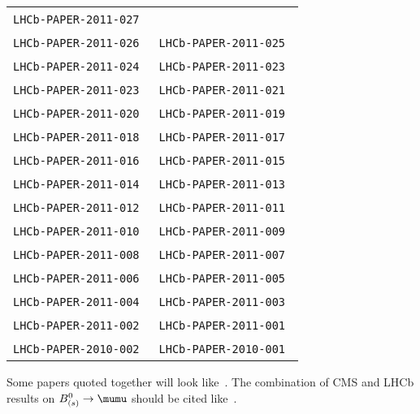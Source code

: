 \begin{center}
\begin{longtable}{ll}
\texttt{LHCb-PAPER-2011-027}~\cite{LHCb-PAPER-2011-027} \\
\texttt{LHCb-PAPER-2011-026}~\cite{LHCb-PAPER-2011-026} &
\texttt{LHCb-PAPER-2011-025}~\cite{LHCb-PAPER-2011-025} \\
\texttt{LHCb-PAPER-2011-024}~\cite{LHCb-PAPER-2011-024} &
\texttt{LHCb-PAPER-2011-023}~\cite{LHCb-PAPER-2011-023} \\
\texttt{LHCb-PAPER-2011-023}~\cite{LHCb-PAPER-2011-022} &
\texttt{LHCb-PAPER-2011-021}~\cite{LHCb-PAPER-2011-021} \\
\texttt{LHCb-PAPER-2011-020}~\cite{LHCb-PAPER-2011-020} &
\texttt{LHCb-PAPER-2011-019}~\cite{LHCb-PAPER-2011-019} \\
\texttt{LHCb-PAPER-2011-018}~\cite{LHCb-PAPER-2011-018} &
\texttt{LHCb-PAPER-2011-017}~\cite{LHCb-PAPER-2011-017} \\
\texttt{LHCb-PAPER-2011-016}~\cite{LHCb-PAPER-2011-016} &
\texttt{LHCb-PAPER-2011-015}~\cite{LHCb-PAPER-2011-015} \\
\texttt{LHCb-PAPER-2011-014}~\cite{LHCb-PAPER-2011-014} &
\texttt{LHCb-PAPER-2011-013}~\cite{LHCb-PAPER-2011-013} \\
\texttt{LHCb-PAPER-2011-012}~\cite{LHCb-PAPER-2011-012} &
\texttt{LHCb-PAPER-2011-011}~\cite{LHCb-PAPER-2011-011} \\
\texttt{LHCb-PAPER-2011-010}~\cite{LHCb-PAPER-2011-010} &
\texttt{LHCb-PAPER-2011-009}~\cite{LHCb-PAPER-2011-009} \\
\texttt{LHCb-PAPER-2011-008}~\cite{LHCb-PAPER-2011-008} &
\texttt{LHCb-PAPER-2011-007}~\cite{LHCb-PAPER-2011-007} \\
\texttt{LHCb-PAPER-2011-006}~\cite{LHCb-PAPER-2011-006} &
\texttt{LHCb-PAPER-2011-005}~\cite{LHCb-PAPER-2011-005} \\
\texttt{LHCb-PAPER-2011-004}~\cite{LHCb-PAPER-2011-004} &
\texttt{LHCb-PAPER-2011-003}~\cite{LHCb-PAPER-2011-003} \\
\texttt{LHCb-PAPER-2011-002}~\cite{LHCb-PAPER-2011-002} &
\texttt{LHCb-PAPER-2011-001}~\cite{LHCb-PAPER-2011-001} \\
\hline
\texttt{LHCb-PAPER-2010-002}~\cite{LHCb-PAPER-2010-002} &
\texttt{LHCb-PAPER-2010-001}~\cite{LHCb-PAPER-2010-001} \\
\hline
\end{longtable}
\end{center}

Some \lhcb papers quoted together will look
like~\cite{LHCb-PAPER-2011-007,LHCb-PAPER-2011-006,
  LHCb-PAPER-2011-005,LHCb-PAPER-2011-004,LHCb-PAPER-2011-003}.
The combination of CMS and LHCb results on $B^0_{(s)} \to \mumu$ should be cited like~\cite{LHCb-CONF-2013-012}.

